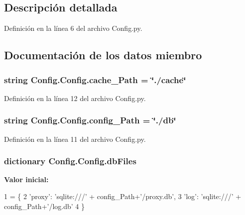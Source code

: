 \subsection{Descripción detallada}


Definición en la línea 6 del archivo Config.\-py.



\subsection{Documentación de los datos miembro}
\hypertarget{class_config_1_1_config_ac40dcb73f850406655e85747ee4f244a}{
\subsubsection[{cache\-\_\-\-Path}]{\setlength{\rightskip}{0pt plus 5cm}string Config.\-Config.\-cache\-\_\-\-Path = \char`\"{}./cache\char`\"{}\hspace{0.3cm}{\ttfamily [static]}}}\label{class_config_1_1_config_ac40dcb73f850406655e85747ee4f244a}


Definición en la línea 12 del archivo Config.\-py.

\hypertarget{class_config_1_1_config_a2cf86b6dc19ce8b8458261d408a66d3a}{
\subsubsection[{config\-\_\-\-Path}]{\setlength{\rightskip}{0pt plus 5cm}string Config.\-Config.\-config\-\_\-\-Path = \char`\"{}./db\char`\"{}\hspace{0.3cm}{\ttfamily [static]}}}\label{class_config_1_1_config_a2cf86b6dc19ce8b8458261d408a66d3a}


Definición en la línea 11 del archivo Config.\-py.

\hypertarget{class_config_1_1_config_a62ca676b07391529a5c1abd433bed57f}{
\subsubsection[{db\-Files}]{\setlength{\rightskip}{0pt plus 5cm}dictionary Config.\-Config.\-db\-Files\hspace{0.3cm}{\ttfamily [static]}}}\label{class_config_1_1_config_a62ca676b07391529a5c1abd433bed57f}
{\bfseries Valor inicial\-:}
\begin{DoxyCode}
1 = \{
2         \textcolor{stringliteral}{'proxy'}: \textcolor{stringliteral}{'sqlite:///'} + config\_Path+\textcolor{stringliteral}{'/proxy.db'},
3         \textcolor{stringliteral}{'log'}: \textcolor{stringliteral}{'sqlite:///'} + config\_Path+\textcolor{stringliteral}{'/log.db'}
4     \}
\end{DoxyCode}


